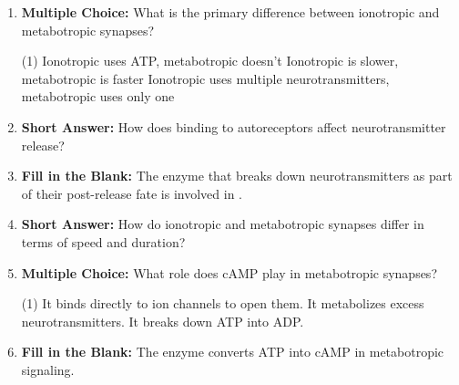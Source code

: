 \begin{enumerate}[label=\textbf{Q2.5.\arabic*}]
      \item \textbf{Multiple Choice:} What is the primary difference between ionotropic and metabotropic synapses?
            \begin{tasks}[label=\textcolor{draculafg}{(\Alph*)}, item-format=\color{draculafg}, label-width=1.5em, item-indent=1.7em](1)
                  \task {}
                  \task Ionotropic uses ATP, metabotropic doesn't
                  \task Ionotropic is slower, metabotropic is faster
                  \task Ionotropic uses multiple neurotransmitters, metabotropic uses only one
            \end{tasks}
            
      \item \textbf{Short Answer:} How does binding to autoreceptors affect neurotransmitter release? \\
            
      \item \textbf{Fill in the Blank:} The enzyme that breaks down neurotransmitters as part of their post-release fate is involved in . \\

      \item \textbf{Short Answer:} How do ionotropic and metabotropic synapses differ in terms of speed and duration? \\

      \item \textbf{Multiple Choice:} What role does cAMP play in metabotropic synapses?
            \begin{tasks}[label=\textcolor{draculafg}{(\Alph*)}, item-format=\color{draculafg}, label-width=1.5em, item-indent=1.7em](1)
                  \task It binds directly to ion channels to open them.
                  \task {}
                  \task It metabolizes excess neurotransmitters.
                  \task It breaks down ATP into ADP.
            \end{tasks}

      \item \textbf{Fill in the Blank:} The enzyme  converts ATP into cAMP in metabotropic signaling. \\


\end{enumerate}
